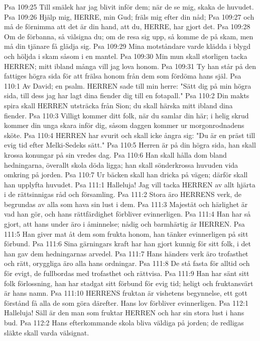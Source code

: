 Psa 109:25  Till smälek har jag blivit inför dem; när de se mig, skaka de huvudet.
Psa 109:26  Hjälp mig, HERRE, min Gud; fräls mig efter din nåd;
Psa 109:27  och må de förnimma att det är din hand, att du, HERRE, har gjort det.
Psa 109:28  Om de förbanna, så välsigna du; om de resa sig upp, så komme de på skam, men må din tjänare få glädja sig.
Psa 109:29  Mina motståndare varde klädda i blygd och höljda i skam såsom i en mantel.
Psa 109:30  Min mun skall storligen tacka HERREN; mitt ibland många vill jag lova honom.
Psa 109:31  Ty han står på den fattiges högra sida för att frälsa honom från dem som fördöma hans själ.
Psa 110:1  Av David; en psalm. HERREN sade till min herre: "Sätt dig på min högra sida, till dess jag har lagt dina fiender dig till en fotapall."
Psa 110:2  Din makts spira skall HERREN utsträcka från Sion; du skall härska mitt ibland dina fiender.
Psa 110:3  Villigt kommer ditt folk, när du samlar din här; i helig skrud kommer din unga skara inför dig, såsom daggen kommer ur morgonrodnadens sköte.
Psa 110:4  HERREN har svurit och skall icke ångra sig: "Du är en präst till evig tid efter Melki-Sedeks sätt."
Psa 110:5  Herren är på din högra sida, han skall krossa konungar på sin vredes dag.
Psa 110:6  Han skall hålla dom bland hedningarna, överallt skola döda ligga; han skall sönderkrossa huvuden vida omkring på jorden.
Psa 110:7  Ur bäcken skall han dricka på vägen; därför skall han upplyfta huvudet.
Psa 111:1  Halleluja! Jag vill tacka HERREN av allt hjärta i de rättsinnigas råd och församling.
Psa 111:2  Stora äro HERRENS verk, de begrundas av alla som hava sin lust i dem.
Psa 111:3  Majestät och härlighet är vad han gör, och hans rättfärdighet förbliver evinnerligen.
Psa 111:4  Han har så gjort, att hans under äro i åminnelse; nådig och barmhärtig är HERREN.
Psa 111:5  Han giver mat åt dem som frukta honom, han tänker evinnerligen på sitt förbund.
Psa 111:6  Sina gärningars kraft har han gjort kunnig för sitt folk, i det han gav dem hedningarnas arvedel.
Psa 111:7  Hans händers verk äro trofasthet och rätt, oryggliga äro alla hans ordningar.
Psa 111:8  De stå fasta för alltid och för evigt, de fullbordas med trofasthet och rättvisa.
Psa 111:9  Han har sänt sitt folk förlossning, han har stadgat sitt förbund för evig tid; heligt och fruktansvärt är hans namn.
Psa 111:10  HERRENS fruktan är vishetens begynnelse, ett gott förstånd få alla de som göra därefter. Hans lov förbliver evinnerligen.
Psa 112:1  Halleluja! Säll är den man som fruktar HERREN och har sin stora lust i hans bud.
Psa 112:2  Hans efterkommande skola bliva väldiga på jorden; de redligas släkte skall varda välsignat.
